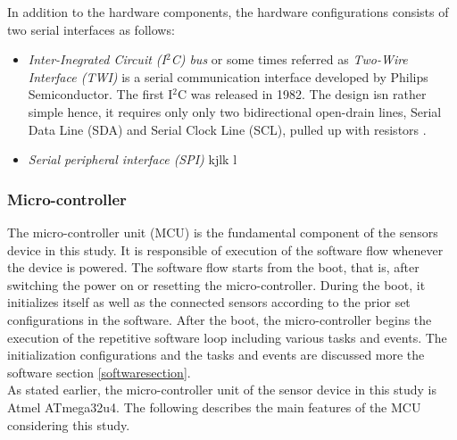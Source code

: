 \documentclass[english,12pt,a4paper,pdftex,elec,utf8]{aaltothesis}
\begin{document}
In addition to the hardware components, the hardware configurations consists of two serial interfaces as follows:

\begin{itemize}
\item \textit{Inter-Inegrated Circuit (I$^2$C) bus} or some times referred as \textit{Two-Wire Interface (TWI)} is a serial communication interface developed by Philips Semiconductor. The first I$^2$C was released in 1982. The design isn rather simple hence, it requires only only two bidirectional open-drain lines, Serial Data Line (SDA) and Serial Clock Line (SCL), pulled up with resistors \cite{i2cmanual}.


\item \textit{Serial peripheral interface (SPI)} \cite{spimanual} kjlk l
\end{itemize}


\subsubsection*{Micro-controller}

The micro-controller unit (MCU) is the fundamental component of the sensors device in this study. It is responsible of execution of the software flow whenever the device is powered. The software flow starts from the boot, that is, after switching the power on or resetting the micro-controller. During the boot, it initializes itself as well as the connected sensors according to the prior set configurations in the software. After the boot, the micro-controller begins the execution of the repetitive software loop including various tasks and events. The initialization configurations and the tasks and events are discussed more the software section \ref{softwaresection}. \\

As stated earlier, the micro-controller unit of the sensor device in this study is Atmel ATmega32u4. The following describes the main features of the MCU considering this study.
\end{document}
